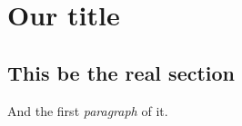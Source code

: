 \documentclass{article}
\author{Sample Author}
\begin{document}
\maketitle 

\section{Our title}

\subsection{This be the real section}
And the first \emph{paragraph} of it.
\end{document}
